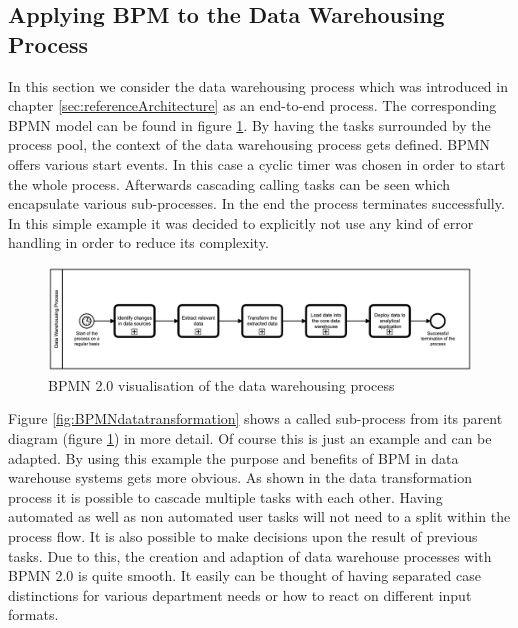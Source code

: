 \subsection{Applying BPM to the Data Warehousing Process}
In this section we consider the data warehousing process which was introduced in chapter \ref{sec:referenceArchitecture} as an end-to-end process. The corresponding BPMN model can be found in figure \ref{fig:BPMNdatawarehousing}.\newline
By having the tasks surrounded by the process pool, the context of the data warehousing process gets defined. BPMN offers various start events. In this case a cyclic timer was chosen in order to start the whole process. Afterwards cascading calling tasks can be seen which encapsulate various sub-processes. In the end the process terminates successfully. In this simple example it was decided to explicitly not use any kind of error handling in order to reduce its complexity.\newline
\\
\begin{figure}[!htb]
    \centering
    \includegraphics[scale=0.15]{pictures/DataWarehousingProcess.png}
    \caption{BPMN 2.0 visualisation of the data warehousing process}
    \label{fig:BPMNdatawarehousing}
\end{figure}
Figure \ref{fig:BPMNdatatransformation} shows a called sub-process from its parent diagram (figure \ref{fig:BPMNdatawarehousing}) in more detail. Of course this is just an example and can be adapted. By using this example the purpose and benefits of BPM in data warehouse systems gets more obvious.\newline
As shown in the data transformation process it is possible to cascade multiple tasks with each other. Having automated as well as non automated user tasks will not need to a split within the process flow. It is also possible to make decisions upon the result of previous tasks. Due to this, the creation and adaption of data warehouse processes with BPMN 2.0 is quite smooth. It easily can be thought of having separated case distinctions for various department needs or how to react on different input formats.\newline 
